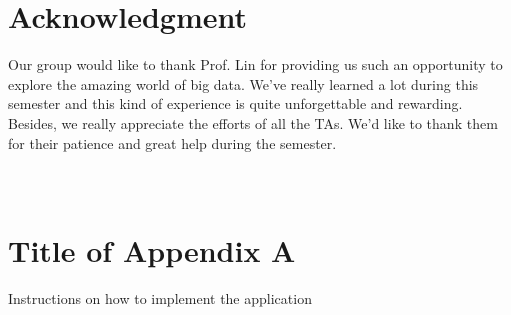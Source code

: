 \documentclass[10pt, conference, compsocconf]{IEEEtran}
\begin{document}


\section*{Acknowledgment}



Our group would like to thank Prof. Lin for providing us such an opportunity to explore the amazing world of big data. We\rq ve really learned a lot during this semester and this kind of experience is quite unforgettable and rewarding. Besides, we really appreciate the efforts of all the TAs. We\rq d like to thank them for their patience and great help during the semester.

\newpage
\appendix
\section{\\Title of Appendix A} \label{App:AppendixA}

Instructions on how to implement the application\\
\end{document}
